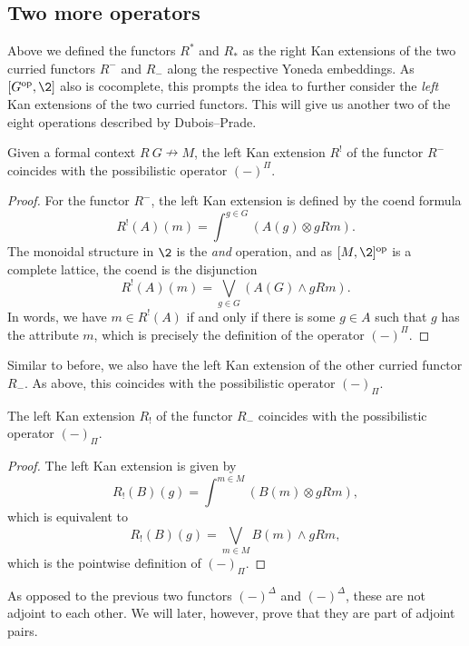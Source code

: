\subsection{Two more operators}

Above we defined the functors $R^*$ and $R_*$ as the right Kan extensions of the two curried functors $R^-$ and $R_-$ along the respective Yoneda embeddings. As $[G\op, \2]$ also is cocomplete, this prompts the idea to further consider the \emph{left} Kan extensions of the two curried functors. This will give us another two of the eight operations described by Dubois--Prade. 

\begin{lemma}
    \label{lm:upper-Pi}
    Given a formal context $R\: G\nrightarrow M$, the left Kan extension $R^!$ of the functor $R^-$ coincides with the possibilistic operator $(-)^\Pi$.  
\end{lemma}
\begin{proof}
    For the functor $R^-$, the left Kan extension is defined by the coend formula
    \[R^!(A)(m) = \int^{g\in G}(A(g)\otimes gRm).\]
    The monoidal structure in $\2$ is the \emph{and} operation, and as $[M,\2]\op$ is a complete lattice, the coend is the disjunction
    \[R^!(A)(m) = \bigvee_{g\in G}(A(G)\wedge gRm).\]
    In words, we have $m\in R^!(A)$ if and only if there is some $g\in A$ such that $g$ has the attribute $m$, which is precisely the definition of the operator $(-)^\Pi$.
\end{proof}

Similar to before, we also have the left Kan extension of the other curried functor $R_-$. As above, this coincides with the possibilistic operator $(-)_\Pi$. 

\begin{lemma}
    \label{lm:lower-Pi}
    The left Kan extension $R_!$ of the functor $R_-$ coincides with the possibilistic operator $(-)_\Pi$. 
\end{lemma}
\begin{proof}
    The left Kan extension is given by
    \[R_!(B)(g) = \int^{m\in M}(B(m)\otimes gRm),\]
    which is equivalent to 
    \[R_!(B)(g)=\bigvee_{m\in M}B(m)\wedge gRm,\]
    which is the pointwise definition of $(-)_\Pi$. 
\end{proof}

As opposed to the previous two functors $(-)^\Delta$ and $(-)^\Delta$, these are not adjoint to each other. We will later, however, prove that they are part of adjoint pairs. 


